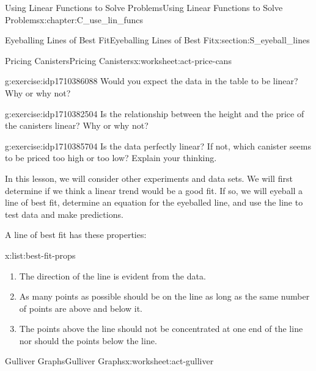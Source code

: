 \documentclass[oneside,10pt,]{book}
\numberwithin{equation}{chapter}
\begin{document}
\begin{chapterptx}{Using Linear Functions to Solve Problems}{}{Using Linear Functions to Solve Problems}{}{}{x:chapter:C_use_lin_funcs}
\begin{sectionptx}{Eyeballing Lines of Best Fit}{}{Eyeballing Lines of Best Fit}{}{}{x:section:S_eyeball_lines}
\begin{worksheet-subsection}{Pricing Canisters}{}{Pricing Canisters}{}{}{x:worksheet:act-price-cans}
\begin{sidebyside}{2}{0}{0}{0}
\begin{sbspanel}{0.5}
\end{sbspanel}%
\end{sidebyside}%
\begin{divisionexercise}{1}{}{}{g:exercise:idp1710386088}%
Would you expect the data in the table to be linear? Why or why not?%
\end{divisionexercise}%
\begin{divisionexercise}{2}{}{}{g:exercise:idp1710382504}%
Is the relationship between the height and the price of the canisters linear? Why or why not?%
\end{divisionexercise}%
\begin{divisionexercise}{3}{}{}{g:exercise:idp1710385704}%
Is the data perfectly linear? If not, which canister seems to be priced too high or too low? Explain your thinking.%
\end{divisionexercise}%
\begin{conclusion}{}%
In this lesson, we will consider other experiments and data sets. We will first determine if we think a linear trend would be a good fit. If so, we will eyeball a line of best fit, determine an equation for the eyeballed line, and use the line to test data and make predictions.%
\par
A line of best fit has these properties: \begin{listptx}{\textbf{}}{x:list:best-fit-props}{}%
%
\begin{enumerate}[label=(\alph*)]
\item{}The direction of the line is evident from the data.%
\item{}As many points as possible should be on the line as long as the same number of points are above and below it.%
\item{}The points above the line should not be concentrated at one end of the line nor should the points below the line.%
\end{enumerate}
\end{listptx}%
%
\end{conclusion}%
\end{worksheet-subsection}
\restoregeometry
%
%
\typeout{************************************************}
\typeout{************************************************}
%
\begin{worksheet-subsection}{Gulliver Graphs}{}{Gulliver Graphs}{}{}{x:worksheet:act-gulliver}
\begin{introduction}{}%

\end{introduction}
\end{worksheet-subsection}
\end{sectionptx}
\end{chapterptx}
\end{document}
